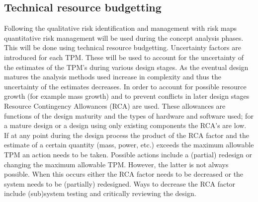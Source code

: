 \subsection{Technical resource budgetting}
Following the qualitative risk identification and management with risk maps quantitative risk management will be used during the concept analysis phases. This will be done using technical resource budgetting. Uncertainty factors are introduced for each TPM. These will be used to account for the uncertainty of the estimates of the TPM's during various design stages. As the eventual design matures the analysis methods used increase in complexity and thus the uncertainty of the estimates decreases. In order to account for possible resource growth (for example mass growth) and to prevent conflicts in later design stages Resource Contingency Allowances (RCA) are used. These allowances are functions of the design maturity and the types of hardware and software used; for a mature design or a design using only existing components the RCA's are low. \\
\noindent If at any point during the design process the product of the RCA factor and the estimate of a certain quantity (mass, power, etc.) exceeds the maximum allowable TPM an action needs to be taken. Possible actions include a (partial) redesign or changing the maximum allowable TPM. However, the latter is not always possible. When this occurs either the RCA factor needs to be decreased or the system needs to be (partially) redesigned. Ways to decrease the RCA factor include (sub)system testing and critically reviewing the design.